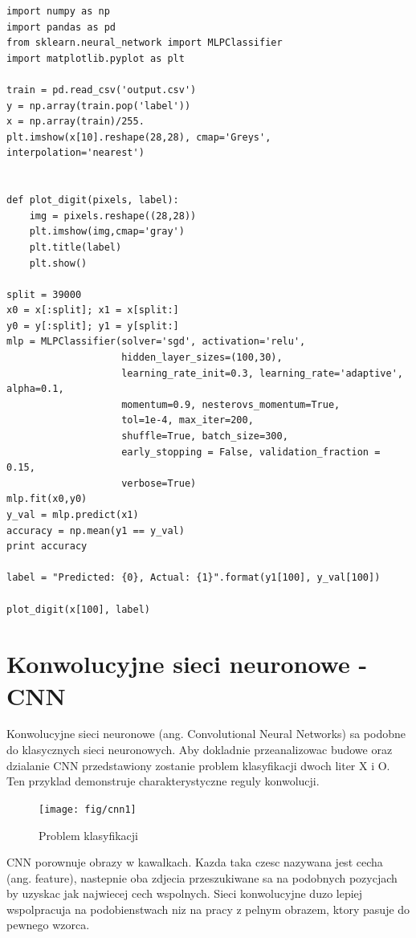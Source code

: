 \documentclass[brudnopis]{xmgr}
\begin{document}
\begin{lstlisting}
import numpy as np
import pandas as pd
from sklearn.neural_network import MLPClassifier
import matplotlib.pyplot as plt

train = pd.read_csv('output.csv')
y = np.array(train.pop('label'))
x = np.array(train)/255.
plt.imshow(x[10].reshape(28,28), cmap='Greys', interpolation='nearest')


def plot_digit(pixels, label):
    img = pixels.reshape((28,28))
    plt.imshow(img,cmap='gray')
    plt.title(label)
    plt.show()

split = 39000
x0 = x[:split]; x1 = x[split:]
y0 = y[:split]; y1 = y[split:]
mlp = MLPClassifier(solver='sgd', activation='relu',
                    hidden_layer_sizes=(100,30),
                    learning_rate_init=0.3, learning_rate='adaptive', alpha=0.1,
                    momentum=0.9, nesterovs_momentum=True,
                    tol=1e-4, max_iter=200,
                    shuffle=True, batch_size=300,
                    early_stopping = False, validation_fraction = 0.15,
                    verbose=True)
mlp.fit(x0,y0)
y_val = mlp.predict(x1)
accuracy = np.mean(y1 == y_val)
print accuracy

label = "Predicted: {0}, Actual: {1}".format(y1[100], y_val[100])

plot_digit(x[100], label)
\end{lstlisting}

\section{Konwolucyjne sieci neuronowe - CNN}

Konwolucyjne sieci neuronowe (ang. Convolutional Neural Networks) sa podobne do klasycznych sieci neuronowych. Aby dokladnie przeanalizowac budowe oraz dzialanie CNN przedstawiony zostanie problem klasyfikacji dwoch liter X i O. Ten przyklad demonstruje charakterystyczne reguly konwolucji.

\begin{figure}[!tbh]
\centering
\texttt{[image: fig/cnn1]}
\caption{Problem klasyfikacji}
\end{figure}
CNN porownuje obrazy w kawalkach. Kazda taka czesc nazywana jest cecha (ang. feature), nastepnie oba zdjecia przeszukiwane sa na podobnych pozycjach by uzyskac jak najwiecej cech wspolnych. Sieci konwolucyjne duzo lepiej wspolpracuja na podobienstwach niz na pracy z pelnym obrazem, ktory pasuje do pewnego wzorca.
\newpage
\end{document}
